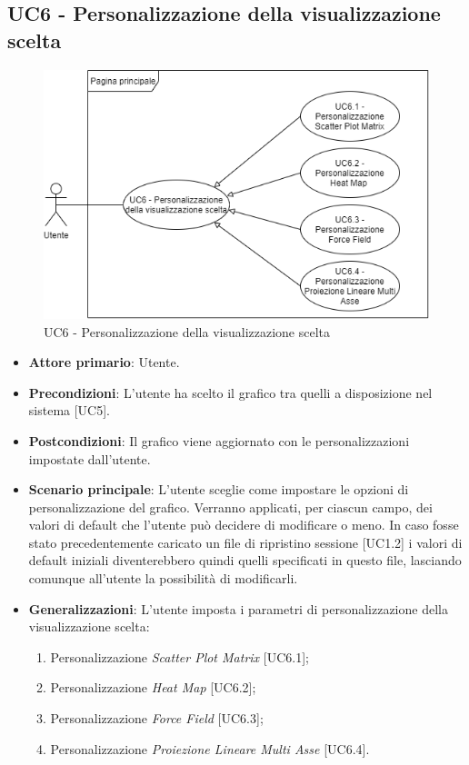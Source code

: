 \subsection{UC6 - Personalizzazione della visualizzazione scelta}
\begin{figure}[h]
\includegraphics[width=\linewidth]{../Images/UC6.png}
\centering
\caption{UC6 - Personalizzazione della visualizzazione scelta}
\end{figure}
\begin{itemize}
	\item \textbf{Attore primario}: Utente.
	
	\item \textbf{Precondizioni}: L'utente ha scelto il grafico tra quelli a disposizione nel sistema [UC5].
	
	\item \textbf{Postcondizioni}: Il grafico viene aggiornato con le personalizzazioni impostate dall'utente.
	
	\item \textbf{Scenario principale}: L’utente sceglie come impostare le opzioni di personalizzazione del grafico. Verranno applicati, per ciascun campo, dei valori di default che l'utente può decidere di modificare o meno. In caso fosse stato precedentemente caricato un file di ripristino sessione [UC1.2] i valori di default iniziali diventerebbero quindi quelli specificati in questo file, lasciando comunque all'utente la possibilità di modificarli.
	
	\item \textbf{Generalizzazioni}: L'utente imposta i parametri di personalizzazione della visualizzazione scelta:
	\begin{enumerate}
	\item Personalizzazione \textit{Scatter Plot Matrix} [UC6.1];
	\item Personalizzazione \textit{Heat Map} [UC6.2];
	\item Personalizzazione \textit{Force Field} [UC6.3];
	\item Personalizzazione \textit{Proiezione Lineare Multi Asse} [UC6.4].
	\end{enumerate}
		
\end{itemize}


